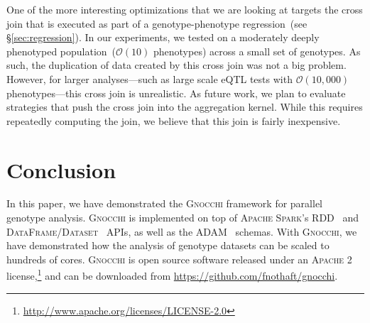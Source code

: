 \documentclass[11pt]{article} %
\begin{document}
One of the more interesting optimizations that we are looking at targets the
cross join that is executed as part of a genotype-phenotype regression~(see
\S\ref{sec:regression}). In our experiments, we tested on a moderately deeply
phenotyped population~($\mathcal{O}(10)$ phenotypes) across a small set of
genotypes. As such, the duplication of data created by this cross join was
not a big problem. However, for larger analyses---such as large scale eQTL
tests with $\mathcal{O}(10,000)$ phenotypes---this cross join is unrealistic.
As future work, we plan to evaluate strategies that push the cross join into
the aggregation kernel. While this requires repeatedly computing the join,
we believe that this join is fairly inexpensive.

\section{Conclusion}
\label{sec:conclusion}

In this paper, we have demonstrated the \textsc{Gnocchi} framework for parallel
genotype analysis. \textsc{Gnocchi} is implemented on top of \textsc{Apache
Spark}'s \textsc{RDD}~\cite{zaharia12, zaharia10} and
\textsc{DataFrame}/\textsc{Dataset}~\cite{armbrust15} APIs, as well as the
\textsc{ADAM}~\cite{massie13, nothaft15} schemas. With \textsc{Gnocchi}, we have
demonstrated how the analysis of genotype datasets can be scaled to hundreds
of cores. \textsc{Gnocchi} is open source software released under an\textsc{
Apache 2} license,\footnote{\url{http://www.apache.org/licenses/LICENSE-2.0}}
and can be downloaded from \url{https://github.com/fnothaft/gnocchi}.



\end{document}
